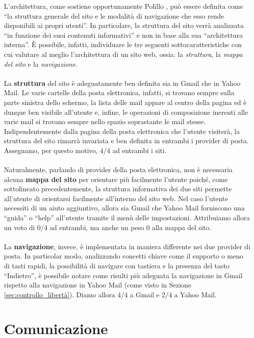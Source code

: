 		L'architettura, come sostiene opportunamente Polillo \cite{polillo:modello}, può essere definita come ``la struttura generale del sito e le modalità di navigazione che esso rende disponibili ai propri utenti''. In particolare, la struttura del sito verrà analizzata ``in funzione dei suoi contenuti informativi'' e non in base alla sua ``architettura interna''. È possibile, infatti, individuare le tre seguenti sottocaratteristiche con cui valutare al meglio l'architettura di un sito web, ossia: la \textit{struttura}, la \textit{mappa del sito} e la \textit{navigazione}.\\
		\\
		La \textbf{struttura} del sito è adeguatamente ben definita sia in Gmail che in Yahoo Mail. Le varie cartelle della posta elettronica, infatti, si trovano sempre sulla parte sinistra dello schermo, la lista delle mail appare al centro della pagina ed è dunque ben visibile all'utente e, infine, le operazioni di composizione inerenti alle varie mail si trovano sempre nello spazio soprastante le mail stesse. Indipendentemente dalla pagina della posta elettronica che l'utente visiterà, la struttura del sito rimarrà invariata e ben definita in entrambi i provider di posta. Assegnamo, per questo motivo, $4/4$ ad entrambi i siti.\\
		\\
		Naturalmente, parlando di provider della posta elettronica, non è necessaria alcuna \textbf{mappa del sito} per orientare più facilmente l'utente poiché, come sottolineato precedentemente, la struttura informativa dei due siti permette all'utente di orientarsi facilmente all'interno del sito web. Nel caso l'utente necessiti di un aiuto aggiuntivo, allora sia Gmail che Yahoo Mail forniscono una ``guida'' o ``help'' all'utente tramite il menù delle impostazioni. Attribuiamo allora un voto di $0/4$ ad entrambi, ma anche un peso $0$ alla mappa del sito.\\
		\\
		La \textbf{navigazione}, invece, è implementata in maniera differente nei due provider di posta. In particolar modo, analizzando concetti chiave come il supporto o meno di tasti rapidi, la possibilità di navigare con tastiera e la presenza del tasto ``Indietro'', è possibile notare come risulti più adeguata la navigazione in Gmail rispetto alla navigazione in Yahoo Mail (come visto in Sezione \ref{sec:controllo_libertà}). Diamo allora $4/4$ a Gmail e $2/4$ a Yahoo Mail.
	
	\section{Comunicazione} \label{sec:comunicazione}
	
